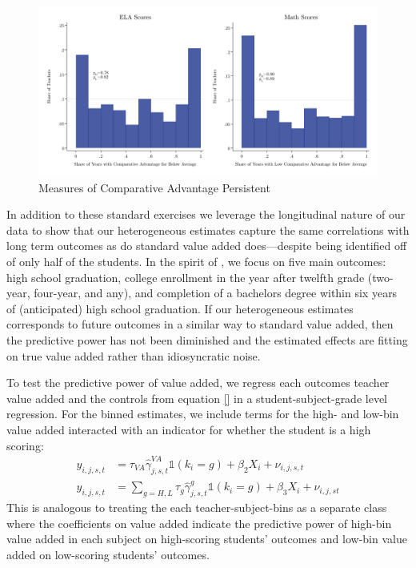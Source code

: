 \documentclass[12pt]{article}
\theoremstyle{definition}
\theoremstyle{definition}
\theoremstyle{definition}
\theoremstyle{definition}
\begin{document}
\begin{figure}
    \includegraphics[width=\textwidth]{Working_Paper/test_figures/02b_hist.pdf}
    \caption{Measures of Comparative Advantage Persistent}
    \label{fig:robust2}
\end{figure}


In addition to these standard exercises we leverage the longitudinal nature of our data to show that our heterogeneous estimates capture the same correlations with long term outcomes as do standard value added does---despite being identified off of only half of the students.  In the spirit of \citet{chetty2014measuring2}, we focus on five main outcomes: high school graduation, college enrollment in the year after twelfth grade (two-year, four-year, and any), and completion of a bachelors degree within six years of (anticipated) high school graduation. If our heterogeneous estimates corresponds to future outcomes in a similar way to standard value added, then the predictive power has not been diminished and the estimated effects are fitting on true value added rather than idiosyncratic noise. 

To test the predictive power of value added, we regress each outcomes teacher value added and the controls from equation \ref{} in a student-subject-grade level regression. For the binned estimates, we include terms for the high- and low-bin value added interacted with an indicator for whether the student is a high scoring: 
    \begin{align}\label{long}
        y_{i,j,s,t} &= \tau_{VA} \hat{\gamma}^{VA}_{j,s,t}\mathds{1}(k_i = g) + \beta_2 X_i + \nu_{i,j,s,t} \\ \nonumber
        y_{i,j,s,t} &= \sum_{g=H,L} \tau_{g} \hat{\gamma}^g_{j,s,t}\mathds{1}(k_i = g) + \beta_3 X_i + \nu_{i,j,st}
    \end{align}
\noindent   This is analogous to treating the each teacher-subject-bins as a separate class where the coefficients on value added indicate the predictive power of high-bin value added in each subject on high-scoring students' outcomes  and low-bin value added on low-scoring students' outcomes. 
\end{document}
